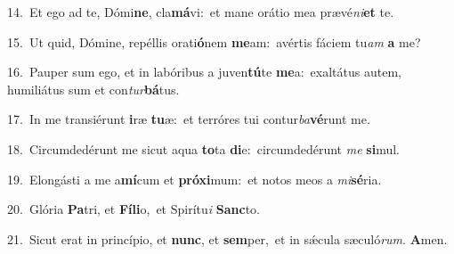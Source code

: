 {\numbfont\textcolor{\numbcolor}{14.}}~Et ego ad te, Dómi\-\textbf{ne}\-, cla\-\textbf{má}\-vi:~\star et mane orátio mea prævé\-\textit{ni}\-\textbf{et} te.\par
{\numbfont\textcolor{\numbcolor}{15.}}~Ut quid, Dómine, repéllis orati\-\textbf{ó}\-nem \textbf{me}\-am:~\star avértis fáciem tu\textit{am} \textbf{a} me?\par
{\numbfont\textcolor{\numbcolor}{16.}}~Pauper sum ego, et in labóribus a juven\-\textbf{tú}\-te \textbf{me}\-a:~\star exaltátus autem, humiliátus sum et con\-\textit{tur}\-\textbf{bá}tus.\par
{\numbfont\textcolor{\numbcolor}{17.}}~In me transiérunt \textbf{i}\-ræ \textbf{tu}\-æ:~\star et terróres tui contur\-\textit{ba}\-\textbf{vé}runt me.\par
{\numbfont\textcolor{\numbcolor}{18.}}~Circumdedérunt me sicut aqua \textbf{to}\-ta \textbf{di}\-e:~\star circumdedérunt \textit{me} \textbf{si}\-mul.\par
{\numbfont\textcolor{\numbcolor}{19.}}~Elongásti a me a\-\textbf{mí}\-cum et \textbf{pró}\-\textbf{xi}mum:~\star et notos meos a \textit{mi}\-\textbf{sé}ria.\par
{\numbfont\textcolor{\numbcolor}{20.}}~Glória \textbf{Pa}\-tri, et \textbf{Fí}\-\textbf{li}o,~\star et Spirítu\textit{i} \textbf{Sanc}\-to.\par
{\numbfont\textcolor{\numbcolor}{21.}}~Sicut erat in princípio, et \textbf{nunc}\-, et \textbf{sem}\-per,~\star et in sǽcula sæculó\-\textit{rum}\-. \textbf{A}\-men.\par
